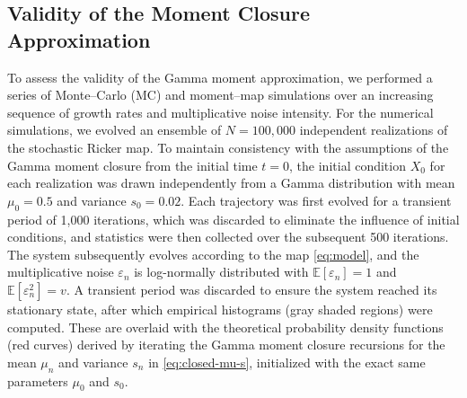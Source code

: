 \documentclass[12pt]{article}
\theoremstyle{definition}
\begin{document}
\subsection{Validity of the Moment Closure Approximation}
To assess the validity of the Gamma moment approximation,  we performed a series of Monte--Carlo (MC) and moment--map simulations over an increasing sequence of growth rates and multiplicative noise intensity. For the numerical simulations, we evolved an ensemble of \(N = 100{,}000\) independent realizations of the stochastic Ricker map. To maintain consistency with the assumptions of the Gamma moment closure from the initial time \(t=0\), the initial condition \(X_0\) for each realization was drawn independently from a Gamma distribution with mean \(\mu_0 = 0.5\) and variance \(s_0 = 0.02\). Each trajectory was first evolved for a transient period of 1{,}000 iterations, which was discarded to eliminate the influence of initial conditions, and statistics were then collected over the subsequent 500 iterations.  The system subsequently evolves according to the map \eqref{eq:model}, and the multiplicative noise $\varepsilon_n$ is log-normally distributed with $\mathbb{E}[\varepsilon_n]=1$ and $\mathbb{E}[\varepsilon_n^2]=v$. A transient period was discarded to ensure the system reached its stationary state, after which empirical histograms (gray shaded regions) were computed. These are overlaid with the theoretical probability density functions (red curves) derived by iterating the Gamma moment closure recursions for the mean $\mu_n$ and variance $s_n$ in  \eqref{eq:closed-mu-s}, initialized with the exact same parameters $\mu_0$ and $s_0$.
\end{document}

